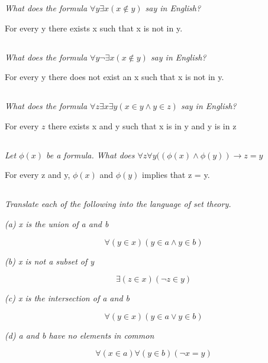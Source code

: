 \documentclass[11pt,oneside,titlepage]{book}
\begin{document}
\textit{What does the formula $\forall y \exists x (x \notin y)$ say in English?}

For every y there exists x such that x is not in y.

\subsection{}

\textit{What does the formula $\forall y \neg \exists x (x \notin y)$ say in English?}

For every y there does not exist an x such that x is not in y.

\subsection{}

\textit{What does the formula $\forall z \exists x \exists y (x \in y \land y \in z)$
  say in English?}

For every $z$ there exists x and y such that x is in y and y is in z

\subsection{}

\textit{Let $\phi(x)$ be a formula. What does $\forall z \forall y((\phi(x) \land \phi(y))
  \to z = y$}

For every z and y, $\phi(x)$ and $\phi(y)$ implies that z = y.

\subsection{}

\textit{Translate each of the following into the language of set theory.}

\textit{(a) x is the union of a and b}

$$\forall (y \in x) (y \in a \land y \in b)$$

\textit{(b) x is not a subset of y}

$$\exists (z \in x) (\neg z \in y)$$

\textit{(c) x is the intersection of a and b}

$$\forall (y \in x) (y \in a \lor y \in b)$$

\textit{(d) a and b have no elements in common}

$$\forall (x \in a) \forall (y \in b) (\neg x = y)$$
\end{document}
